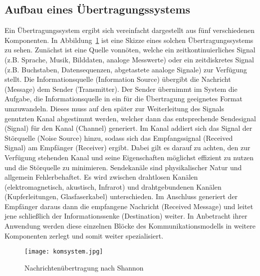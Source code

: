 \subsection{Aufbau eines Übertragungssystems}
\label{subsec:aufbauueber}

Ein Übertragungssystem ergibt sich vereinfacht dargestellt aus fünf verschiedenen Komponenten. In Abbildung~\ref{fig:komsystem} ist eine Skizze eines solchen Übertragungssystems zu sehen. Zunächst ist eine Quelle vonnöten, welche ein zeitkontinuierliches Signal (z.B. Sprache, Musik, Bilddaten, analoge Messwerte) oder ein zeitdiskretes Signal (z.B. Buchstaben, Datensequenzen, abgetastete analoge Signale) zur Verfügung stellt. Die Informationsquelle (Information Source) übergibt die Nachricht (Message) dem Sender (Transmitter). Der Sender übernimmt im System die Aufgabe, die Informationsquelle in ein für die Übertragung geeignetes Format umzuwandeln. Dieses muss auf den später zur Weiterleitung des Signals genutzten Kanal abgestimmt werden, welcher dann das entsprechende Sendesignal (Signal) für den Kanal (Channel) generiert. Im Kanal addiert sich das Signal der Störquelle (Noise Source) hinzu, sodass sich das Empfangssignal (Received Signal) am Empfänger (Receiver) ergibt. Dabei gilt es darauf zu achten, den zur Verfügung stehenden Kanal und seine Eigenschaften möglichst effizient zu nutzen und die Störquelle zu minimieren. Sendekanäle sind physikalischer Natur und allgemein Fehlerbehaftet. Es wird zwischen drahtlosen Kanälen (elektromagnetisch, akustisch, Infrarot) und drahtgebundenen Kanälen (Kupferleitungen, Glasfaserkabel) unterschieden. Im Anschluss generiert der Empfänger daraus dann die empfangene Nachricht (Received Message) und leitet jene schließlich der Informationssenke (Destination) weiter. In Anbetracht ihrer Anwendung werden diese einzelnen Blöcke des Kommunikationsmodells in weitere Komponenten zerlegt und somit weiter spezialisiert. \cite{wernerNachrichtentechnikEinfuehrungFuer2010}

\begin{figure}[H]
	\centering
	\texttt{[image: komsystem.jpg]}
	\caption[Nachrichtenübertragung nach Shannon]{Nachrichtenübertragung nach Shannon} 
	\cite{shannon}
	\label{fig:komsystem}
\end{figure}

